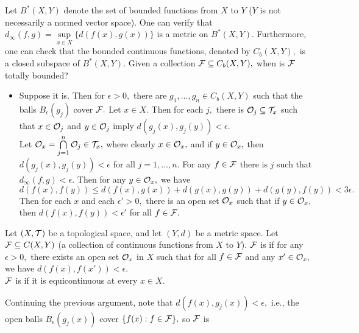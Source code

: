 \noindent Let $B^*(X,Y)$ denote the set of bounded functions from $X$ to $Y$ ($Y$ is not necessarily a normed vector space). One can verify that $d_{\infty}(f,g)=\sup\limits_{x\in X}\{d(f(x),g(x))\}$ is a metric on $B^*(X,Y).$ Furthermore, one can check that the bounded continuous functions, denoted by $C_b(X,Y),$ is a closed subspace of $B^*(X,Y).$ Given a collection $\mathcal{F}\subseteq C_b(X,Y),$ when is $\mathcal{F}$ totally bounded?
\begin{itemize}
\item Suppose it is. Then for $\epsilon>0,$ there are $g_1,\hdots,g_n\in C_b(X,Y)$ such that the balls $B_{\epsilon}(g_j)$ cover $\mathcal{F}.$ Let $x\in X.$ Then for each $j,$ there is $\mathcal{O}_j\subseteq\mathcal{T}_x$ such that $x\in\mathcal{O}_j$ and $y\in\mathcal{O}_j$ imply $d(g_j(x),g_j(y))<\epsilon.$ \\
Let $\mathcal{O}_x=\bigcap\limits_{j=1}^n\mathcal{O}_j\in\mathcal{T}_x,$ where clearly $x\in\mathcal{O}_x,$ and if $y\in\mathcal{O}_x,$ then $d(g_j(x),g_j(y))<\epsilon$ for all $j=1,\hdots,n.$ For any $f\in\mathcal{F}$ there is $j$ such that $d_{\infty}(f,g)<\epsilon.$ Then for any $y\in\mathcal{O}_x,$ we have
$$d(f(x),f(y))\leq d(f(x),g(x))+d(g(x),g(y))+d(g(y),f(y))<3\epsilon.$$
Then for each $x$ and each $\epsilon'>0,$ there is an open set $\mathcal{O}_x$ such that if $y\in\mathcal{O}_x,$ then $d(f(x),f(y))<\epsilon'$ for all $f\in\mathcal{F}.$
\end{itemize}

\begin{defn}
Let $(X,\mathcal{T})$ be a topological space, and let $(Y,d)$ be a metric space. Let $\mathcal{F}\subseteq C(X,Y)$ (a collection of continuous functions from $X$ to $Y$). $\mathcal{F}$ is  if for any $\epsilon>0,$ there exists an open set $\mathcal{O}_x$ in $X$ such that for all $f\in\mathcal{F}$ and any $x'\in\mathcal{O}_x,$ we have $d(f(x),f(x'))<\epsilon.$ \\
$\mathcal{F}$ is  if it is equicontinuous at every $x\in X.$
\end{defn}
\noindent Continuing the previous argument, note that $d(f(x),g_j(x))<\epsilon,$ i.e., the open balls $B_{\epsilon}(g_j(x))$ cover $\{f(x):f\in\mathcal{F}\},$ so $\mathcal{F}$ is 

